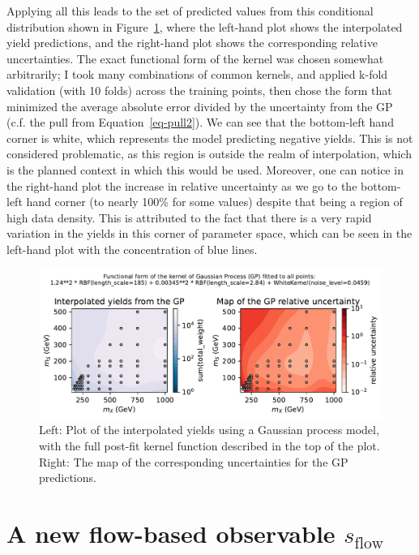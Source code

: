 \documentclass[
  11pt,
  numbers=noendperiod]{book}
\begin{document}
Applying all this leads to the set of predicted values from this
conditional distribution shown in Figure~\ref{fig-sh-gp}, where the
left-hand plot shows the interpolated yield predictions, and the
right-hand plot shows the corresponding relative uncertainties. The
exact functional form of the kernel was chosen somewhat arbitrarily; I
took many combinations of common kernels, and applied k-fold validation
(with 10 folds) across the training points, then chose the form that
minimized the average absolute error divided by the uncertainty from the
GP (c.f. the pull from Equation~\ref{eq-pull2}). We can see that the
bottom-left hand corner is white, which represents the model predicting
negative yields. This is not considered problematic, as this region is
outside the realm of interpolation, which is the planned context in
which this would be used. Moreover, one can notice in the right-hand
plot the increase in relative uncertainty as we go to the bottom-left
hand corner (to nearly 100\% for some values) despite that being a
region of high data density. This is attributed to the fact that there
is a very rapid variation in the yields in this corner of parameter
space, which can be seen in the left-hand plot with the concentration of
blue lines.

\begin{figure}

{\centering \includegraphics{./images/sh/gp.pdf}

}

\caption{\label{fig-sh-gp}Left: Plot of the interpolated yields using a
Gaussian process model, with the full post-fit kernel function described
in the top of the plot. Right: The map of the corresponding
uncertainties for the GP predictions.}

\end{figure}

\hypertarget{a-new-flow-based-observable-s_textflow}{%
\section{\texorpdfstring{A new flow-based observable
\(s_{\text{flow}}\)}{A new flow-based observable s\_\{\textbackslash text\{flow\}\}}}\label{a-new-flow-based-observable-s_textflow}}
\end{document}
